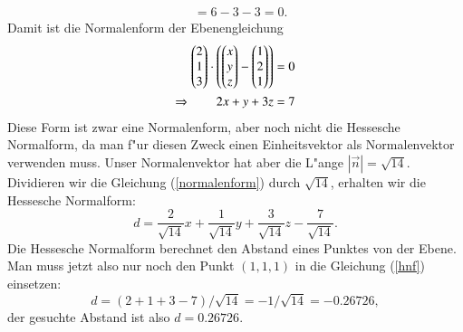 \begin{beispiel}
\begin{align*}
&=6-3-3=0.
\end{align*}
Damit ist die Normalenform der Ebenengleichung
\begin{align}
\begin{pmatrix}2\\1\\3\end{pmatrix}\cdot\left(
\begin{pmatrix}x\\y\\z\end{pmatrix} - \begin{pmatrix}1\\2\\1\end{pmatrix}
\right)&=0\notag\\
\Rightarrow\qquad
2x+y+3z&=7\label{normalenform}
\end{align}
Diese Form ist zwar eine Normalenform, aber noch nicht die Hessesche
Normalform, da man f"ur diesen Zweck einen Einheitsvektor als
Normalenvektor verwenden muss.
Unser Normalenvektor hat aber die L"ange $|\vec n|=\sqrt{14}$.
Dividieren wir die Gleichung (\ref{normalenform})
durch $\sqrt{14}$, erhalten wir die Hessesche Normalform:
\begin{equation}
d=\frac{2}{\sqrt{14}}x+\frac{1}{\sqrt{14}}y+\frac{3}{\sqrt{14}}z-\frac{7}{\sqrt{14}}.
\label{hnf}
\end{equation}
Die Hessesche Normalform berechnet den Abstand eines Punktes von der
Ebene.
Man muss jetzt also nur noch den Punkt $(1,1,1)$ in die  Gleichung
(\ref{hnf}) einsetzen:
\[
d = (2+1+3-7)/\sqrt{14}=-1/\sqrt{14}=-0.26726,
\]
der gesuchte Abstand ist also $d=0.26726$.
\end{beispiel}

